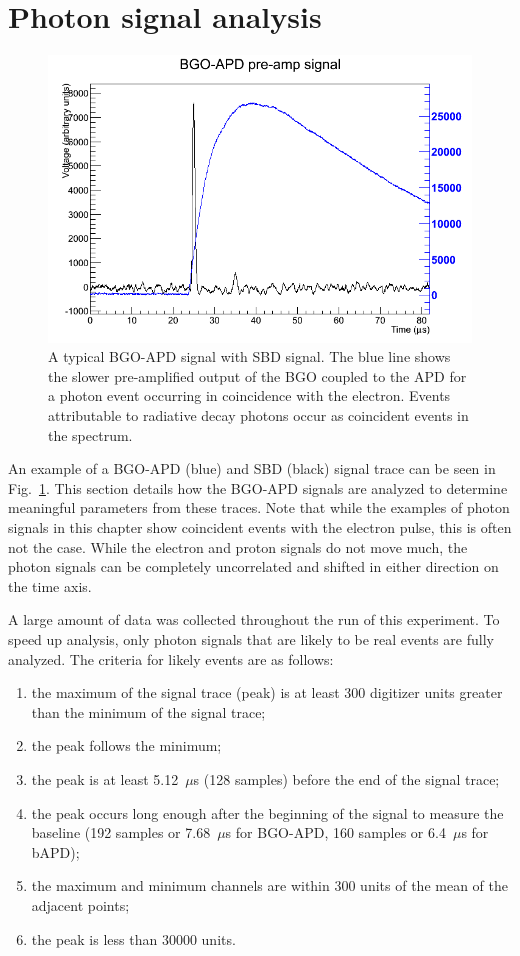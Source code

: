 \documentclass[oneside,12pt]{memoir}
\begin{document}
\section{Photon signal analysis}
\label{sec:photoanalysis}
\begin{figure}[t]
	\includegraphics[width=\textwidth]{BGO_waveform.png}
	\caption[A typical BGO-APD signal with SBD signal.]{A typical BGO-APD signal with SBD signal. The blue line shows the slower pre-amplified output of the BGO coupled to the APD for a photon event occurring in coincidence with the electron. Events attributable to radiative decay photons occur as coincident events in the spectrum.}
	\label{fig:bgo_signal_ch4}
\end{figure}
An example of a BGO-APD (blue) and SBD (black) signal trace can be seen in Fig.~\ref{fig:bgo_signal_ch4}. This section details how the BGO-APD signals are analyzed to determine meaningful parameters from these traces. Note that while the examples of photon signals in this chapter show coincident events with the electron pulse, this is often not the case. While the electron and proton signals do not move much, the photon signals can be completely uncorrelated and shifted in either direction on the time axis.\par
A large amount of data was collected throughout the run of this experiment. To speed up analysis, only photon signals that are likely to be real events are fully analyzed. The criteria for likely events are as follows:\par
\begin{enumerate}
	\item the maximum of the signal trace (peak) is at least 300 digitizer units greater than the minimum of the signal trace;
	\item the peak follows the minimum;
	\item the peak is at least 5.12~$\mu$s (128 samples) before the end of the signal trace;
	\item the peak occurs long enough after the beginning of the signal to measure the baseline (192 samples or 7.68~$\mu$s for BGO-APD, 160 samples or 6.4~$\mu$s for bAPD);
	\item the maximum and minimum channels are within 300 units of the mean of the adjacent points;
	\item the peak is less than 30000 units.
\end{enumerate}\par
\end{document}
